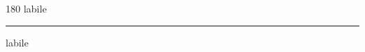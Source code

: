 
\begin{frame}
\begin{center}
\begin{turn}{180}
{\fontsize{2.5cm}{1em}\selectfont labile}
\end{turn}
\vspace{1em}\par  
\hrule
\vspace{1em}\par  
{\fontsize{2.5cm}{1em}\selectfont labile}
\end{center}
\end{frame}
